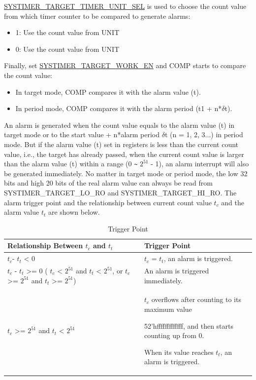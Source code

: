 \documentclass[main\_\_EN.tex]{subfiles}
\begin{document}
\hyperref[fielddesc:SYSTIMERTARGET0TIMERUNITSEL]{SYSTIMER\_TARGET\_TIMER\_UNIT\_SEL} is used to choose the count value from which timer counter to be compared to generate alarms:

\begin{itemize}
        \item 1: Use the count value from UNIT
        \item 0: Use the count value from UNIT
\end{itemize}

Finally, set \hyperref[fielddesc:SYSTIMERTARGET0WORKEN]{SYSTIMER\_TARGET\_WORK\_EN} and COMP starts to compare the count value:

\begin{itemize}
        \item In target mode, COMP compares it with the alarm value (t).
        \item In period mode, COMP compares it with the alarm period (t1 + n*$\delta$t).
\end{itemize}

An alarm is generated when the count value equals to the alarm value (t) in target mode or to the start value + n*alarm period $\delta$t (n = 1, 2, 3...) in period mode. But if the alarm value (t) set in registers is less than the current count value, i.e., the target has already passed, when the current count value is larger than the alarm value (t) within a range (0 \verb+~+ $2^{51}$ - 1), an alarm interrupt will also be generated immediately. No matter in target mode or period mode, the low 32 bits and high 20 bits of the real alarm value can always be read from SYSTIMER\_TARGET\_LO\_RO and SYSTIMER\_TARGET\_HI\_RO. The alarm trigger point and the relationship between current count value $t_{c}$ and the alarm value $t_{t}$ are shown below.

\begin{longtable}[c]{ | p{5cm} | p{7.5cm} |}
\caption{Trigger Point}\\\hline
\rowcolor{lightgray}
\textbf{Relationship Between $t_{c}$ and $t_{t}$} & \textbf{Trigger Point}\\ \hline
\endhead
$t_{c}$- $t_{t}$ < 0 & $t_{c}$ = $t_{t}$, an alarm is triggered.\\ \hline
$t_{c}$ - $t_{t}$ >= 0 \newline ( $t_{c}$ < $2^{51}$ and $t_{t}$ < $2^{51}$, \newline or $t_{c}$ >= $2^{51}$ and $t_{t}$ >= $2^{51}$) & An alarm is triggered immediately. \\ \hline
\multirow{3}{*}{
$t_{c}$ >= $2^{51}$ and $t_{t}$ < $2^{51}$} &

$t_{c}$ overflows after counting to its maximum value

52'hfffffffffffff, and then starts counting up from 0.

When its value reaches $t_{t}$, an alarm is triggered. \\ \hline
\end{longtable}
\end{document}
